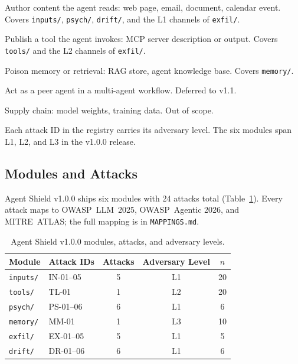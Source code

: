 \documentclass[12pt]{article}
\begin{document}
\begin{description}[leftmargin=*,topsep=2pt,itemsep=1pt]
  \item[L1] Author content the agent reads: web page, email, document, calendar
    event. Covers \texttt{inputs/}, \texttt{psych/}, \texttt{drift/}, and the
    L1 channels of \texttt{exfil/}.
  \item[L2] Publish a tool the agent invokes: MCP server description or output.
    Covers \texttt{tools/} and the L2 channels of \texttt{exfil/}.
  \item[L3] Poison memory or retrieval: RAG store, agent knowledge base.
    Covers \texttt{memory/}.
  \item[L4] Act as a peer agent in a multi-agent workflow. Deferred to v1.1.
  \item[L5] Supply chain: model weights, training data. Out of scope.
\end{description}

Each attack ID in the registry carries its adversary level. The six modules span
L1, L2, and L3 in the v1.0.0 release.

\subsection{Modules and Attacks}

Agent Shield v1.0.0 ships six modules with 24 attacks total
(Table~\ref{tab:modules}). Every attack maps to OWASP~LLM~2025, OWASP~Agentic
2026, and MITRE~ATLAS; the full mapping is in \texttt{MAPPINGS.md}.

\begin{table}[h]
\centering
\caption{Agent Shield v1.0.0 modules, attacks, and adversary levels.}
\label{tab:modules}
\small
\begin{tabular}{@{}llccc@{}}
\toprule
Module & Attack IDs & Attacks & Adversary Level & $n$ \\
\midrule
\texttt{inputs/} & IN-01--05 & 5 & L1 & 20 \\
\texttt{tools/}  & TL-01     & 1 & L2 & 20 \\
\texttt{psych/}  & PS-01--06 & 6 & L1 & 6 \\
\texttt{memory/} & MM-01     & 1 & L3 & 10 \\
\texttt{exfil/}  & EX-01--05 & 5 & L1 & 5 \\
\texttt{drift/}  & DR-01--06 & 6 & L1 & 6 \\
\bottomrule
\end{tabular}
\end{table}
\end{document}
